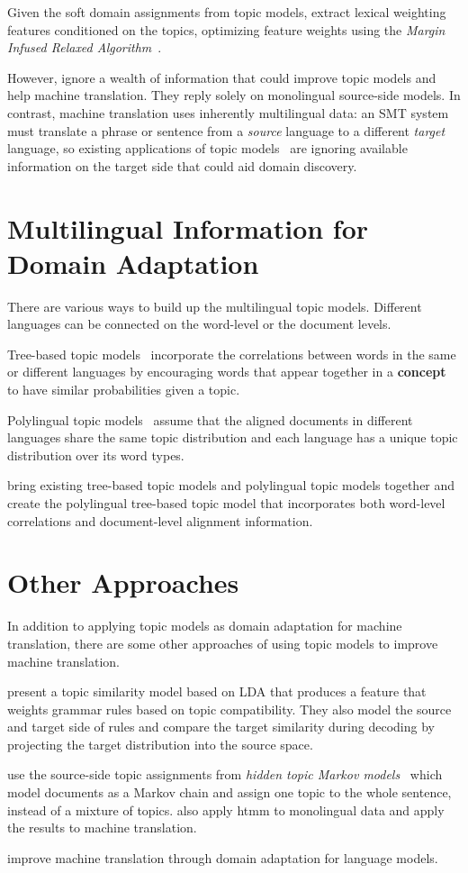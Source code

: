 Given the soft domain assignments from topic models, \citet{Eidelman-12} extract lexical weighting features conditioned on the topics, optimizing feature weights using the \emph{Margin Infused Relaxed Algorithm}~\citep[\textsc{mira}]{Crammer-06}.

However, \citet{Eidelman-12} ignore a wealth of information that could improve topic models and help machine translation. They reply solely on monolingual source-side models. In contrast, machine translation uses inherently multilingual data: an SMT system must translate a phrase or sentence from a \emph{source} language to a different \emph{target} language, so existing applications of topic models~\citep{Eidelman-12} are ignoring available information on the target side that could aid domain discovery.

\section{Multilingual Information for Domain Adaptation}

There are various ways to build up the multilingual topic models. Different languages can be connected on the word-level or the document levels.

Tree-based topic models~\citep{boyd-graber-07,andrzejewski-09,Hu:Boyd-Graber:Satinoff-ur} incorporate the correlations between words in the same or different languages by encouraging words that appear together in a {\bf concept} to have similar probabilities given a topic.

Polylingual topic models~\citep{mimno-09} assume that the aligned documents in different languages share the same topic distribution and each language has a unique topic distribution over its word types.

\citet{hu-14} bring existing tree-based topic models and polylingual topic models together and create the polylingual tree-based topic model that incorporates both word-level correlations and document-level alignment information.

\section{Other Approaches}

In addition to applying topic models as domain adaptation for machine translation, there are some other approaches of using topic models to improve machine translation.

\citet{xiao-12} present a topic similarity model based on LDA that produces a feature that weights grammar rules based on topic compatibility. They also model the source and target side of rules and compare the target similarity during decoding by projecting the target distribution into the source space.

\citet{hasler-12} use the source-side topic assignments from \emph{hidden topic Markov models}~\citep[\textsc{htmm}]{gruber-07} which model documents as a Markov chain and assign one topic to the whole sentence, instead of a mixture of topics.  \citet{su-12} also apply htmm to monolingual data and apply the results to machine translation.

\citet{Bellegarda-04,wood-09} improve machine translation through domain adaptation for language models.
